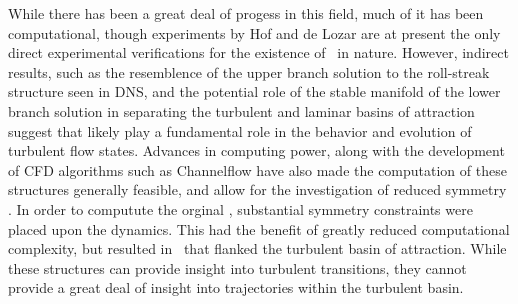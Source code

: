 While there has been a great deal of progess in this field, much of it has been computational, though experiments by Hof and de Lozar are at present the only direct experimental verifications for the existence of \ecs~in nature. However, indirect results, such as the resemblence of the upper branch solution to the roll-streak structure seen in DNS, and the potential role of the stable manifold of the lower branch solution in separating the turbulent and laminar basins of attraction suggest that \ecs likely play a fundamental role in the behavior and evolution of turbulent flow states. Advances in computing power, along with the development of CFD algorithms such as Channelflow have also made the computation of these structures generally feasible, and allow for the investigation of reduced symmetry \ecs. In order to computute the orginal \ecs, substantial symmetry constraints were placed upon the dynamics. This had the benefit of greatly reduced computational complexity, but resulted in \ecs~that flanked the turbulent basin of attraction. While these structures can provide insight into turbulent transitions, they cannot provide a great deal of insight into trajectories within the turbulent basin. 